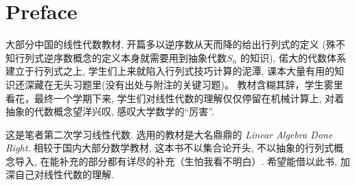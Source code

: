 \chapter{Preface}

大部分中国的线性代数教材, 开篇多以逆序数从天而降的给出行列式的定义
(殊不知行列式逆序数概念的定义本身就需要用到抽象代数\(S_{n}\) 的知识), 偌大的代数体系建立于行列式之上,
学生们上来就陷入行列式技巧计算的泥潭, 课本大量有用的知识还深藏在无头习题里(没有出处与附注的关键习题)。
教材含糊其辞，学生雾里看花，最终一个学期下来,
学生们对线性代数的理解仅仅停留在机械计算上, 对着抽象的代数概念望洋兴叹, 感叹大学数学的``厉害''.

这是笔者第二次学习线性代数. 选用的教材是大名鼎鼎的 \emph{Linear Algebra Done
Right}.
相较于国内大部分数学教材, 这本书不以集合论开头, 不以抽象的行列式概念导入,
在能补充的部分都有详尽的补充（生怕我看不明白）. 希望能借以此书, 加深自己对线性代数的理解.

